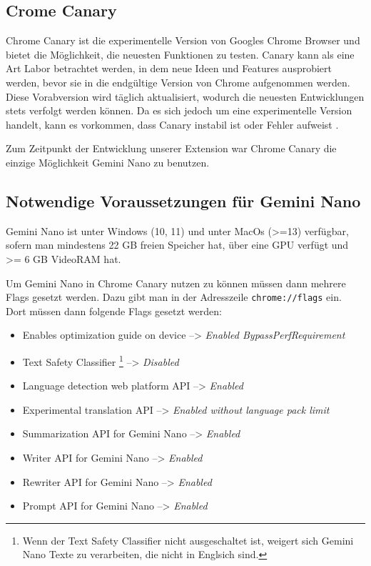 \subsection{Crome Canary}

Chrome Canary ist die experimentelle Version von Googles Chrome Browser und bietet die Möglichkeit, die neuesten Funktionen zu testen. Canary kann als eine Art Labor betrachtet werden, in dem neue Ideen und Features ausprobiert werden, bevor sie in die endgültige Version von Chrome aufgenommen werden. Diese Vorabversion wird täglich aktualisiert, wodurch die neuesten Entwicklungen stets verfolgt werden können. Da es sich jedoch um eine experimentelle Version handelt, kann es vorkommen, dass Canary instabil ist oder Fehler aufweist \cite{chrome-canary}.

Zum Zeitpunkt der Entwicklung unserer Extension war Chrome Canary die einzige Möglichkeit Gemini Nano zu benutzen.

\subsection{Notwendige Voraussetzungen für Gemini Nano}

Gemini Nano ist unter Windows (10, 11) und unter MacOs (>=13) verfügbar, sofern man mindestens 22 GB freien Speicher hat, über eine GPU verfügt und >= 6 GB VideoRAM hat.

Um Gemini Nano in Chrome Canary nutzen zu können müssen dann mehrere Flags gesetzt werden. Dazu gibt man in der Adresszeile \texttt{chrome://flags} ein. Dort müssen dann folgende Flags gesetzt werden:
\begin{itemize}
    \item Enables optimization guide on device --> \emph{Enabled BypassPerfRequirement}
    \item Text Safety Classifier \footnote{Wenn der Text Safety Classifier nicht ausgeschaltet ist, weigert sich Gemini Nano Texte zu verarbeiten, die nicht in Englsich sind.} --> \emph{Disabled}
    \item Language detection web platform API --> \emph{Enabled}
    \item Experimental translation API --> \emph{Enabled without language pack limit}
    \item Summarization API for Gemini Nano --> \emph{Enabled}
    \item Writer API for Gemini Nano --> \emph{Enabled}
    \item Rewriter API for Gemini Nano --> \emph{Enabled}
    \item Prompt API for Gemini Nano --> \emph{Enabled}
\end{itemize}

